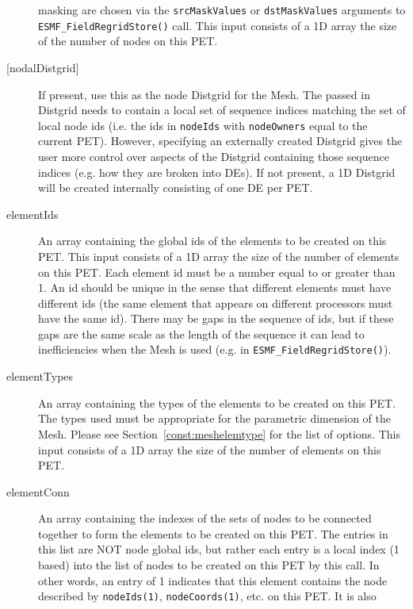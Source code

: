 \begin{description}
            masking are chosen via the {\tt srcMaskValues} or {\tt dstMaskValues} arguments to
            {\tt ESMF\_FieldRegridStore()} call. This input consists of a 1D array the
            size of the number of nodes on this PET.
     \item [{[nodalDistgrid]}]
            If present, use this as the node Distgrid for the Mesh.
            The passed in Distgrid
            needs to contain a local set of sequence indices matching the set of local node ids (i.e. the ids in
            {\tt nodeIds} with {\tt nodeOwners} equal to the current PET).
            However, specifying an externally created Distgrid gives the user more control over aspects of
            the Distgrid containing those sequence indices (e.g. how they are broken into DEs).
            If not present, a 1D Distgrid will be created internally consisting of one DE per PET.
     \item [elementIds]
            An array containing the global ids of the elements to be created on this PET.
            This input consists of a 1D array the size of the number of elements on this PET.
            Each element id must be a number equal to or greater than 1. An id should be
            unique in the sense that different elements must have different ids (the same element
            that appears on different processors must have the same id). There may be gaps in the sequence
            of ids, but if these gaps are the same scale as the length of the sequence it can lead to
            inefficiencies when the Mesh is used (e.g. in {\tt ESMF\_FieldRegridStore()}).
     \item[elementTypes]
            An array containing the types of the elements to be created on this PET. The types used
            must be appropriate for the parametric dimension of the Mesh. Please see
            Section~\ref{const:meshelemtype} for the list of options. This input consists of
            a 1D array the size of the number of elements on this PET.
     \item[elementConn]
           An array containing the indexes of the sets of nodes to be connected together to form the
           elements to be created on this PET. The entries in this list are NOT node global ids,
           but rather each entry is a local index (1 based) into the list of nodes to be
           created on this PET by this call.
           In other words, an entry of 1 indicates that this element contains the node
           described by {\tt nodeIds(1)}, {\tt nodeCoords(1)}, etc. on this PET. It is also

\end{description}
